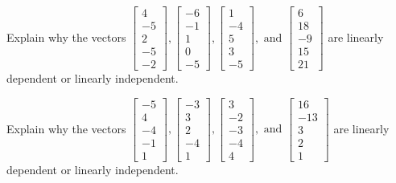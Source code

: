 \documentclass{article}
\begin{document}
\begin{exerciseStatement}
    Explain why the vectors \(\left[\begin{array}{r}
4 \\
-5 \\
2 \\
-5 \\
-2
\end{array}\right] , \left[\begin{array}{r}
-6 \\
-1 \\
1 \\
0 \\
-5
\end{array}\right] , \left[\begin{array}{r}
1 \\
-4 \\
5 \\
3 \\
-5
\end{array}\right] , \text{ and } \left[\begin{array}{r}
6 \\
18 \\
-9 \\
15 \\
21
\end{array}\right]\) are linearly dependent or linearly independent.


  
\end{exerciseStatement}

\begin{exerciseStatement}
    Explain why the vectors \(\left[\begin{array}{r}
-5 \\
4 \\
-4 \\
-1 \\
1
\end{array}\right] , \left[\begin{array}{r}
-3 \\
3 \\
2 \\
-4 \\
1
\end{array}\right] , \left[\begin{array}{r}
3 \\
-2 \\
-3 \\
-4 \\
4
\end{array}\right] , \text{ and } \left[\begin{array}{r}
16 \\
-13 \\
3 \\
2 \\
1
\end{array}\right]\) are linearly dependent or linearly independent.


  
\end{exerciseStatement}
\end{document}
